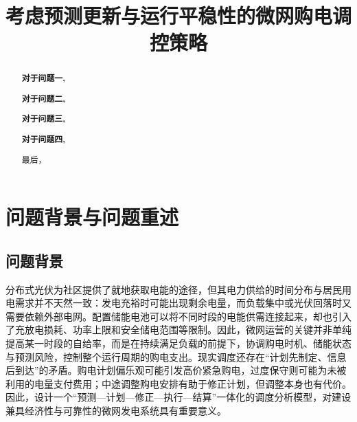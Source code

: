\documentclass[withoutpreface,bwprint]{cumcmthesis}
\title{考虑预测更新与运行平稳性的微网购电调控策略}  %
\begin{document}
	
\maketitle
\thispagestyle{plain}
\begin{abstract}


\textbf{对于问题一,}

\textbf{对于问题二,}

\textbf{对于问题三,}

\textbf{对于问题四,}

最后，




\end{abstract}













\begingroup
\renewcommand{\baselinestretch}{1.12}\selectfont
\titlespacing*{\section}{0pt}{10pt}{10pt}
\titlespacing*{\subsection}{0pt}{8pt}{5pt}

\section{问题背景与问题重述}
\subsection{问题背景}
分布式光伏为社区提供了就地获取电能的途径，但其电力供给的时间分布与居民用电需求并不天然一致：发电充裕时可能出现剩余电量，而负载集中或光伏回落时又需要依赖外部电网。配置储能电池可以将不同时段的电能供需连接起来，却也引入了充放电损耗、功率上限和安全储电范围等限制。因此，微网运营的关键并非单纯提高某一时段的自给率，而是在持续满足负载的前提下，协调购电时机、储能状态与预测风险，控制整个运行周期的购电支出。现实调度还存在“计划先制定、信息后到达”的矛盾。购电计划偏乐观可能引发高价紧急购电，过度保守则可能为未被利用的电量支付费用；中途调整购电安排有助于修正计划，但调整本身也有代价。因此，设计一个“预测—计划—修正—执行—结算”一体化的调度分析模型，对建设兼具经济性与可靠性的微网发电系统具有重要意义。
\end{document}
